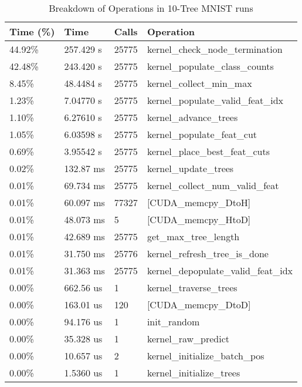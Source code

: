 \documentclass[10pt,conference]{IEEEtran}
\begin{document}
\begin{table*}[t]
\centering
\begin{tabular}{llll}
\toprule
\textbf{Time (\%)} &      \textbf{Time} &  \textbf{Calls} &                         \textbf{Operation} \\
\midrule
  44.92\% &  257.429 s &  25775 &     kernel\_check\_node\_termination \\
  42.48\% &  243.420 s &  25775 &      kernel\_populate\_class\_counts \\
   8.45\% &  48.4484 s &  25775 &            kernel\_collect\_min\_max \\
   1.23\% &  7.04770 s &  25775 &    kernel\_populate\_valid\_feat\_idx \\
   1.10\% &  6.27610 s &  25775 &              kernel\_advance\_trees \\
   1.05\% &  6.03598 s &  25775 &          kernel\_populate\_feat\_cut \\
   0.69\% &  3.95542 s &  25775 &       kernel\_place\_best\_feat\_cuts \\
   0.02\% &  132.87 ms &  25775 &               kernel\_update\_trees \\
   0.01\% &  69.734 ms &  25775 &     kernel\_collect\_num\_valid\_feat \\
   0.01\% &  60.097 ms &  77327 &                [CUDA\_memcpy\_DtoH] \\
   0.01\% &  48.073 ms &      5 &                [CUDA\_memcpy\_HtoD] \\
   0.01\% &  42.689 ms &  25775 &               get\_max\_tree\_length \\
   0.01\% &  31.750 ms &  25776 &       kernel\_refresh\_tree\_is\_done \\
   0.01\% &  31.363 ms &  25775 &  kernel\_depopulate\_valid\_feat\_idx \\
   0.00\% &  662.56 us &      1 &             kernel\_traverse\_trees \\
   0.00\% &  163.01 us &    120 &                [CUDA\_memcpy\_DtoD] \\
   0.00\% &  94.176 us &      1 &                       init\_random \\
   0.00\% &  35.328 us &      1 &                kernel\_raw\_predict \\
   0.00\% &  10.657 us &      2 &       kernel\_initialize\_batch\_pos \\
   0.00\% &  1.5360 us &      1 &           kernel\_initialize\_trees \\
\bottomrule
\end{tabular}
\caption{\label{tab:MAE} Breakdown of Operations in 10-Tree MNIST runs}
\end{table*}
    
\end{document}
